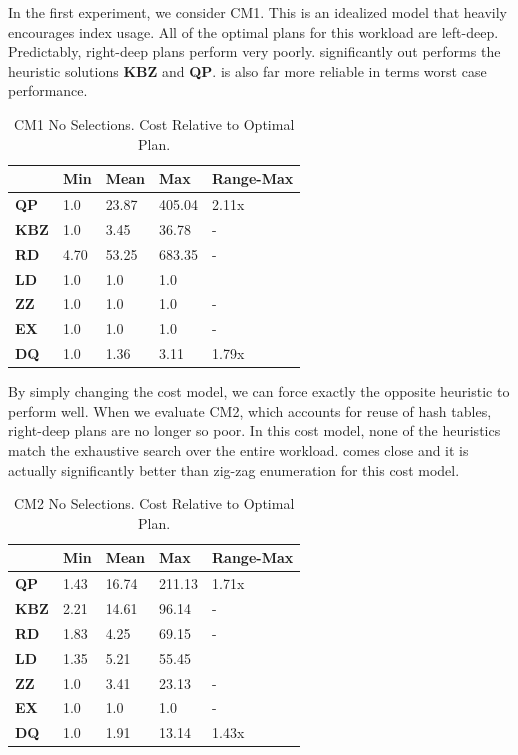 In the first experiment, we consider CM1. This is an idealized model that heavily encourages index usage. All of the optimal plans for this workload are left-deep. Predictably, right-deep plans perform very poorly. \sys significantly out performs the heuristic solutions \textbf{KBZ} and \textbf{QP}. \sys is also far more reliable in terms worst case performance. 

\begin{table}[ht!]\centering \small
\caption{\small{CM1 No Selections. Cost Relative to Optimal Plan.} }\vspace{0.25em}
\begin{tabular}{|l|l|l|l|l|}
\hline
    & {\bf Min}  & {\bf Mean}  & {\bf Max}    & {\bf Range-Max} \\ \hline
{\bf QP}  & 1.0  & 23.87 & 405.04 & 2.11x      \\ \hline
{\bf KBZ} & 1.0  & 3.45  & 36.78  & -         \\ \hline
{\bf RD}  & 4.70 & 53.25 & 683.35 & -         \\ \hline
{\bf LD}  & 1.0  & 1.0   & 1.0    &           \\ \hline
{\bf ZZ}  & 1.0  & 1.0   & 1.0    & -         \\ \hline
{\bf EX}  & 1.0  & 1.0   & 1.0    & -         \\ \hline
\hline
{\bf DQ}  & 1.0  & 1.36   & 3.11    & 1.79x\\ \hline
\end{tabular}
\end{table}

By simply changing the cost model, we can force exactly the opposite heuristic to perform well. When we evaluate CM2, which accounts for reuse of hash tables, right-deep plans are no longer so poor. In this cost model, none of the heuristics match the exhaustive search over the entire workload. \sys comes close and it is actually significantly better than zig-zag enumeration for this cost model.

\begin{table}[ht!]\centering \small
\caption{\small{CM2 No Selections. Cost Relative to Optimal Plan.}}\vspace{0.25em}
\begin{tabular}{|l|l|l|l|l|}
\hline
    & {\bf Min}  & {\bf Mean}  & {\bf Max}    & {\bf Range-Max} \\ \hline
{\bf QP}  & 1.43  & 16.74 & 211.13 & 1.71x      \\ \hline
{\bf KBZ} & 2.21  & 14.61  & 96.14  & -         \\ \hline
{\bf RD}  & 1.83 & 4.25 & 69.15 & -         \\ \hline
{\bf LD}  & 1.35  & 5.21   & 55.45    &           \\ \hline
{\bf ZZ}  & 1.0  & 3.41   & 23.13    & -         \\ \hline
{\bf EX}  & 1.0  & 1.0   & 1.0    & -         \\ \hline
\hline
{\bf DQ}  & 1.0  & 1.91   & 13.14    & 1.43x\\ \hline
\end{tabular}
\end{table}

